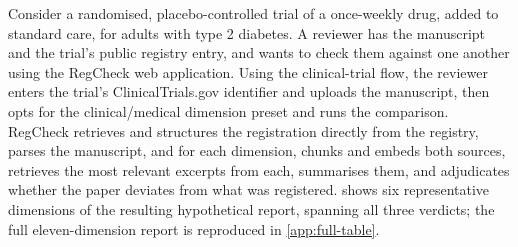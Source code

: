 \documentclass{article}
\begin{document}
Consider a randomised, placebo-controlled trial of a once-weekly drug, added to
standard care, for adults with type 2 diabetes. A reviewer has the manuscript
and the trial's public registry entry, and wants to check them against one
another using the RegCheck web application. Using the clinical-trial flow, the
reviewer enters the trial's ClinicalTrials.gov identifier and uploads the
manuscript, then opts for the clinical/medical dimension preset and runs the
comparison. RegCheck retrieves and structures the registration directly from the
registry, parses the manuscript, and for each dimension, chunks and embeds both
sources, retrieves the most relevant excerpts from each, summarises them, and
adjudicates whether the paper deviates from what was registered.
 shows six representative dimensions of the resulting
hypothetical report, spanning all three verdicts; the full eleven-dimension
report is reproduced in \cref{app:full-table}.
\end{document}
